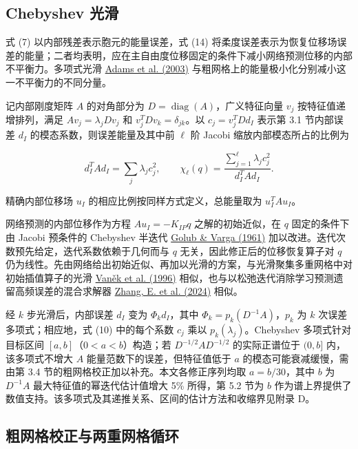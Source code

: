 \documentclass[preprint,12pt,authoryear]{elsarticle}
\begin{document}
\subsection{Chebyshev 光滑}

式 (7) 以内部残差表示胞元的能量误差，式 (14) 将柔度误差表示为恢复位移场误差的能量；二者均表明，应在主自由度位移固定的条件下减小网络预测位移的内部不平衡力。多项式光滑 \href{https://doi.org/10.1016/s0021-9991(03)00194-3}{Adams et al. (2003)} 与粗网格上的能量极小化分别减小这一不平衡力的不同分量。

记内部刚度矩阵 \(A\) 的对角部分为 \(D=\operatorname{diag}(A)\)，广义特征向量 \(v_j\) 按特征值递增排列，满足 \(Av_j=\lambda_jDv_j\) 和 \(v_j^TDv_k=\delta_{jk}\)。以 \(c_j=v_j^TDd_I\) 表示第 3.1 节内部误差 \(d_I\) 的模态系数，则误差能量及其中前 \(\ell\) 阶 Jacobi 缩放内部模态所占的比例为

\[
d_I^TAd_I=\sum_j\lambda_jc_j^2,\qquad
\chi_\ell(q)=\frac{\sum_{j=1}^{\ell}\lambda_jc_j^2}{d_I^TAd_I}.
\tag{10}
\]

精确内部位移场 \(u_I\) 的相应比例按同样方式定义，总能量取为 \(u_I^TAu_I\)。

网络预测的内部位移作为方程 \(Au_I=-K_{IP}q\) 之解的初始近似，在 \(q\) 固定的条件下由 Jacobi 预条件的 Chebyshev 半迭代 \href{https://doi.org/10.1007/BF01386013}{Golub \& Varga (1961)} 加以改进。迭代次数预先给定，迭代系数依赖于几何而与 \(q\) 无关，因此修正后的位移恢复算子对 \(q\) 仍为线性。先由网络给出初始近似、再加以光滑的方案，与光滑聚集多重网格中对初始插值算子的光滑 \href{https://doi.org/10.1007/BF02238511}{Vaněk et al. (1996)} 相似，也与以松弛迭代消除学习预测遗留高频误差的混合求解器 \href{https://doi.org/10.1038/s42256-024-00910-x}{Zhang, E. et al. (2024)} 相似。

经 \(k\) 步光滑后，内部误差 \(d_I\) 变为 \(\Phi_kd_I\)，其中 \(\Phi_k=p_k(D^{-1}A)\)，\(p_k\) 为 \(k\) 次误差多项式；相应地，式 (10) 中的每个系数 \(c_j\) 乘以 \(p_k(\lambda_j)\)。Chebyshev 多项式针对目标区间 \([a,b]\)（\(0<a<b\)）构造；若 \(D^{-1/2}AD^{-1/2}\) 的实际正谱位于 \((0,b]\) 内，该多项式不增大 \(A\) 能量范数下的误差，但特征值低于 \(a\) 的模态可能衰减缓慢，需由第 3.4 节的粗网格校正加以补充。本文各修正序列均取 \(a=b/30\)，其中 \(b\) 为 \(D^{-1}A\) 最大特征值的幂迭代估计值增大 5\% 所得，第 5.2 节为 \(b\) 作为谱上界提供了数值支持。该多项式及其递推关系、区间的估计方法和收缩界见附录 D。

\subsection{粗网格校正与两重网格循环}
\end{document}
